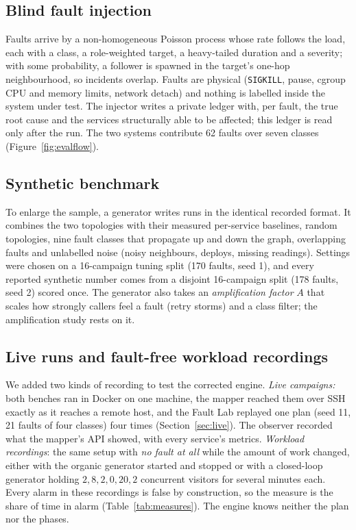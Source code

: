 \subsection{Blind fault injection}
Faults arrive by a non-homogeneous Poisson process whose rate follows the load, each with a class, a role-weighted target, a heavy-tailed duration and a severity; with some probability, a follower is spawned in the target's one-hop neighbourhood, so incidents overlap. Faults are physical (\texttt{SIGKILL}, pause, cgroup CPU and memory limits, network detach) and nothing is labelled inside the system under test. The injector writes a private ledger with, per fault, the true root cause and the services structurally able to be affected; this ledger is read only after the run. The two systems contribute 62 faults over seven classes (Figure~\ref{fig:evalflow}).


\subsection{Synthetic benchmark}
To enlarge the sample, a generator writes runs in the identical recorded format. It combines the two topologies with their measured per-service baselines, random topologies, nine fault classes that propagate up and down the graph, overlapping faults and unlabelled noise (noisy neighbours, deploys, missing readings). Settings were chosen on a 16-campaign tuning split (170 faults, seed 1), and every reported synthetic number comes from a disjoint 16-campaign split (178 faults, seed 2) scored once. The generator also takes an \emph{amplification factor} $A$ that scales how strongly callers feel a fault (retry storms) and a class filter; the amplification study rests on it.

\subsection{Live runs and fault-free workload recordings}
\label{sec:livedesign}
We added two kinds of recording to test the corrected engine. \emph{Live campaigns:} both benches ran in Docker on one machine, the mapper reached them over SSH exactly as it reaches a remote host, and the Fault Lab replayed one plan (seed 11, 21 faults of four classes) four times (Section~\ref{sec:live}). The observer recorded what the mapper's API showed, with every service's metrics. \emph{Workload recordings}: the same setup with \emph{no fault at all} while the amount of work changed, either with the organic generator started and stopped or with a closed-loop generator holding $2, 8, 2, 0, 20, 2$ concurrent visitors for several minutes each. Every alarm in these recordings is false by construction, so the measure is the share of time in alarm (Table~\ref{tab:measures}). The engine knows neither the plan nor the phases.


